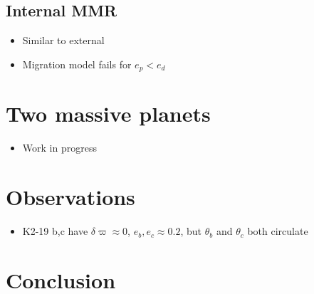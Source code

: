 \documentclass[12pt]{article}
\newcommand{\note}[1]{{\color{red} #1 }}
\newcommand{\edisk}{e_d}
\begin{document}
\subsection{Internal MMR}
\begin{itemize}
\item Similar to external
\item Migration model fails for $e_p<\edisk$
\end{itemize}
\section{Two massive planets}
\begin{itemize}
\item \note{Work in progress}
\end{itemize}
\section{Observations}
\begin{itemize}
\item K2-19 b,c have $\delta\varpi\approx 0$, $e_b,e_c\approx 0.2$,
  but $\theta_b$ and $\theta_c$ both circulate
\end{itemize}
\section{Conclusion}
\end{document}
